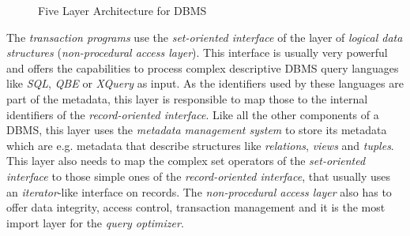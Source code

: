 \begin{@empty}
\begin{figure}[ht!]
{
        }
        \vspace{.75em}
        \caption{Five Layer Architecture for DBMS}
        \label{fig:fivelayerarchitecture}
    \end{figure}
\end{@empty}

    The \emph{transaction programs} use the \emph{set-oriented interface} of the layer of \emph{logical data structures} (\emph{non-procedural access layer}). This interface is usually very powerful and offers the capabilities to process complex descriptive DBMS query languages like \emph{SQL}, \emph{QBE} or \emph{XQuery} as input. As the identifiers used by these languages are part of the metadata, this layer is responsible to map those to the internal identifiers of the \emph{record-oriented interface}. Like all the other components of a DBMS, this layer uses the \emph{metadata management system} to store its metadata which are e.g. metadata that describe structures like \emph{relations}, \emph{views} and \emph{tuples}. This layer also needs to map the complex set operators of the \emph{set-oriented interface} to those simple ones of the \emph{record-oriented interface}, that usually uses an \emph{iterator}-like interface on records. The \emph{non-procedural access layer} also has to offer data integrity, access control, transaction management and it is the most import layer for the \emph{query optimizer}.

